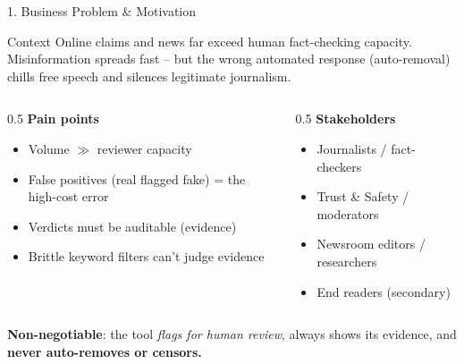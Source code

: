 \documentclass[10pt,aspectratio=169]{beamer}
\begin{document}
\begin{frame}{1. Business Problem \& Motivation}
\begin{block}{Context}
Online claims and news far exceed human fact-checking capacity. Misinformation spreads fast -- but the wrong automated response (auto-removal) chills free speech and silences legitimate journalism.
\end{block}

\begin{columns}[T]
\begin{column}{0.5\textwidth}
\textbf{Pain points}
\begin{itemize}
  \item Volume $\gg$ reviewer capacity
  \item False positives (real flagged fake) = the high-cost error
  \item Verdicts must be auditable (evidence)
  \item Brittle keyword filters can't judge evidence
\end{itemize}
\end{column}
\begin{column}{0.5\textwidth}
\textbf{Stakeholders}
\begin{itemize}
  \item Journalists / fact-checkers
  \item Trust \& Safety / moderators
  \item Newsroom editors / researchers
  \item End readers (secondary)
\end{itemize}
\end{column}
\end{columns}

\vspace{0.15cm}
\centering\small \textbf{Non-negotiable}: the tool \emph{flags for human review}, always shows its evidence, and \textbf{never auto-removes or censors.}
\end{frame}
\end{document}
